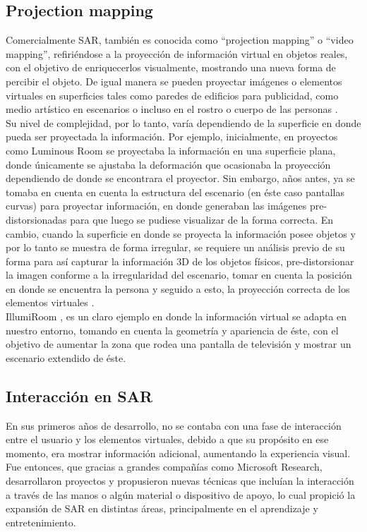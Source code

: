 \documentclass[a4paper,openright,12pt]{report}
\begin{document}
\subsection{Projection mapping}
Comercialmente SAR, también es conocida como ``projection mapping'' o ``video mapping'', refiriéndose a la proyección de información virtual en objetos reales, con el objetivo de enriquecerlos visualmente, mostrando una nueva forma de percibir el objeto. De igual manera se pueden proyectar imágenes o elementos virtuales en superficies tales como paredes de edificios para publicidad, como medio artístico en escenarios o incluso en el rostro o cuerpo de las personas \cite{projectionmapping}.\\
Su nivel de complejidad, por lo tanto, varía dependiendo de la superficie en donde pueda ser proyectada la información. Por ejemplo, inicialmente, en proyectos como Luminous Room \cite{Under1997} se proyectaba la información en una superficie plana, donde únicamente se ajustaba la deformación que ocasionaba la proyección dependiendo de donde se encontrara el proyector. Sin embargo, años antes, ya se tomaba en cuenta en cuenta la estructura del escenario \cite{Dorsey1991} (en éste caso pantallas curvas) para proyectar información, en donde generaban las imágenes pre-distorsionadas para que luego se pudiese visualizar de la forma correcta. En cambio, cuando la superficie en donde se proyecta la información posee objetos y por lo tanto se muestra de forma irregular, se requiere un análisis previo de su forma para así capturar la información 3D de los objetos físicos, pre-distorsionar la imagen conforme a la irregularidad del escenario, tomar en cuenta la posición en donde se encuentra la persona y seguido a esto, la proyección correcta de los elementos virtuales \cite{Raskar1998b,Raskar2001,Starner2003,Wilson2007}.\\
IllumiRoom \cite{jones2013}, es un claro ejemplo en donde la información virtual se adapta en nuestro entorno, tomando en cuenta la geometría y apariencia de éste, con el objetivo de aumentar la zona que rodea una pantalla de televisión y mostrar un escenario extendido de éste.
\subsection{Interacción en SAR}
En sus primeros años de desarrollo, no se contaba con una fase de interacción entre el usuario y los elementos virtuales, debido a que su propósito en ese momento, era mostrar información adicional, aumentando la experiencia visual. Fue entonces, que gracias a grandes compañías como Microsoft Research, desarrollaron proyectos y propusieron nuevas técnicas que incluían la interacción a través de las manos o algún material o dispositivo de apoyo, lo cual propició la expansión de SAR en distintas áreas, principalmente en el aprendizaje y entretenimiento.\\
\end{document}

